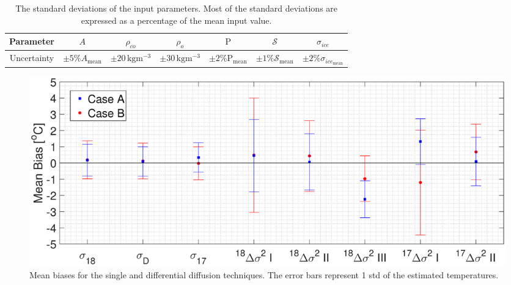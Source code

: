\documentclass[11pt, draftcls, onecolumn]{IEEEtran} %
\numberwithin{equation}{section}
\numberwithin{table}{section}
\numberwithin{figure}{section}
\begin{document}
\begin{table}[H]
	\center
	\caption{The standard deviations of the input parameters. 
		Most of the standard deviations are expressed as a percentage of the mean input value.}
	\label{tbl:model_unc}
	\begin{tabular}{c c c c c c c } 
		\toprule
		Parameter & $A$  & $\rho_{co}$  & $\rho_o$  & $\mathrm{P}$  & $\mathcal{S}$ & $\sigma_{ice}$ \\
		\midrule
		Uncertainty &	$\pm 5 \% A_\mathrm{mean} $  &  $\pm20 \, \mathrm{kg m^{-3}}$  &  $\pm30 \, \mathrm{kg m^{-3}}$   &    $\pm 2 \% \mathrm{P}_\mathrm{mean} $  &     $\pm 1 \% \mathcal{S}_\mathrm{mean} $ 	 & $\pm 2 \% \sigma_{ice_\mathrm{mean}} $ \\
		\bottomrule		
	\end{tabular}
\end{table}




\begin{figure}[]
	\vspace*{2mm}
	\begin{center}
		\includegraphics[width=\textwidth]{Figure_11}
		\caption{Mean biases for the single and differential diffusion techniques.
			The error bars represent 1 std of the estimated temperatures.}  \label{fig:synthetic_data_bias}
	\end{center}
\end{figure}
\end{document}
